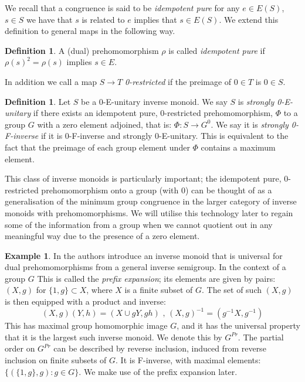 \documentclass[11pt]{amsart}
\theoremstyle{plain}
\theoremstyle{definition}%
\newtheorem{definition}[theorem]{Definition}%
\newtheorem{example}[theorem]{Example}%
\theoremstyle{remark}%
\begin{document}
We recall that a congruence is said to be \textit{idempotent pure} for any $e \in E(S)$, $s \in S$ we have that $s$ is related to $e$ implies that $s \in E(S)$. We extend this definition to general maps in the following way.
\begin{definition}
A (dual) prehomomorphism $\rho$ is called \textit{idempotent pure} if $\rho(s)^{2}=\rho(s)$ implies $s \in E$.  
\end{definition}
In addition we call a map $S \rightarrow T$ \textit{0-restricted} if the preimage of $0 \in T$ is $0 \in S$.

\begin{definition}
Let $S$ be a 0-E-unitary inverse monoid. We say $S$ is \textit{strongly 0-E-unitary} if there exists an idempotent pure, 0-restricted prehomomorphism, $\Phi$ to a group $G$ with a zero element adjoined, that is: $\Phi:S \rightarrow G^{0}$. We say it is \textit{strongly 0-F-inverse} if it is 0-F-inverse and strongly 0-E-unitary. This is equivalent to the fact that the preimage of each group element under $\Phi$ contains a maximum element.
\end{definition}

This class of inverse monoids is particularly important; the idempotent pure, 0-restricted prehomomorphism onto a group (with 0) can be thought of as a generalisation of the minimum group congruence in the larger category of inverse monoids with prehomomorphisms. We will utilise this technology later to regain some of the information from a group when we cannot quotient out in any meaningful way due to the presence of a zero element.

\begin{example}
In \cite{MR745358,MR2221438} the authors introduce an inverse monoid that is universal for dual prehomomorphisms from a general inverse semigroup. In the context of a group $G$ This is called the \textit{prefix expansion}; its elements are given by pairs: $(X,g)$ for $\lbrace 1,g\rbrace \subset X$, where $X$ is a finite subset of $G$. The set of such $(X,g)$ is then equipped with a product and inverse:
\begin{equation*}
(X,g)(Y,h) = (X\cup gY,gh)\mbox{ , } (X,g)^{-1}=(g^{-1}X,g^{-1})
\end{equation*}
This has maximal group homomorphic image $G$, and it has the universal property that it is the largest such inverse monoid. We denote this by $G^{Pr}$. The partial order on $G^{Pr}$ can be described by reverse inclusion, induced from reverse inclusion on finite subsets of $G$. It is F-inverse, with maximal elements: $\lbrace(\lbrace 1,g \rbrace, g):g \in G \rbrace$. We make use of the prefix expansion later.
\end{example}
\end{document}
